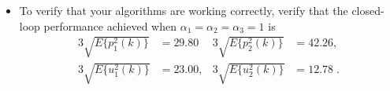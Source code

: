 \begin{itemize}
    \item
    To verify that your algorithms are working correctly, verify that the closed-loop performance achieved when $\alpha_1 = \alpha_2 = \alpha_3 = 1$ is
    \begin{align*}
        3\sqrt{ E \{ p_1^2(k) \} } &  = 29.80
            & 3\sqrt{ E \{ p_2^2(k) \} } &  = 42.26, \\
        3\sqrt{ E \{ u_1^2(k) \} } & = 23.00,
            & 3\sqrt{E \{ u_2^2(k) \} } & = 12.78 \; .
    \end{align*}
\end{itemize}

